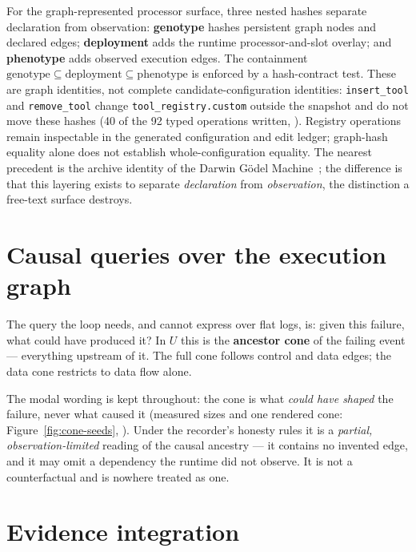 For the graph-represented processor surface, three nested hashes separate
declaration from observation: \textbf{genotype} hashes persistent graph
nodes and declared edges; \textbf{deployment} adds the runtime
processor-and-slot overlay; and \textbf{phenotype} adds observed execution
edges. The containment $\text{genotype} \subseteq \text{deployment}
\subseteq \text{phenotype}$ is enforced by a hash-contract test. These are
graph identities, not complete candidate-configuration identities:
\texttt{insert\_tool} and \texttt{remove\_tool} change
\texttt{tool\_registry.custom} outside the snapshot and do not move these
hashes (40 of the 92 typed operations written, ). Registry operations remain inspectable in the generated
configuration and edit ledger; graph-hash equality alone does not establish
whole-configuration equality. The nearest precedent is the archive identity of the Darwin
G\"odel Machine~\cite{dgm}; the difference is that this layering exists to
separate \emph{declaration} from \emph{observation}, the distinction a
free-text surface destroys.

\section{Causal queries over the execution graph}
\label{sec:cones}

The query the loop needs, and cannot express over flat logs, is: given this
failure, what could have produced it? In $U$ this is the \textbf{ancestor
cone} of the failing event --- everything upstream of it. The full cone
follows control and data edges; the data cone restricts to data flow alone.

The modal wording is kept throughout: the cone is what \emph{could have
shaped} the failure, never what caused it (measured sizes and one rendered
cone: Figure~\ref{fig:cone-seeds}, ). Under the recorder's honesty
rules it is a \emph{partial, observation-limited} reading of the causal
ancestry --- it contains no invented edge, and it may omit a dependency
the runtime did not observe. It is not a counterfactual and is nowhere
treated as one.

\section{Evidence integration}
\label{sec:evidence-integration}

